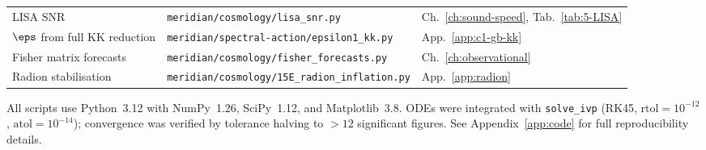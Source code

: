 \begin{table}[h!]
\begin{tabular}{@{}p{3.8cm}p{6.5cm}p{4.2cm}@{}}
LISA SNR &
\texttt{meridian/cosmology/\allowbreak lisa\_snr.py} &
Ch.~\ref{ch:sound-speed}, Tab.~\ref{tab:5-LISA} \\

$\eps$ from full KK reduction &
\texttt{meridian/spectral-action/\allowbreak epsilon1\_kk.py} &
App.~\ref{app:c1-gb-kk} \\

Fisher matrix forecasts &
\texttt{meridian/cosmology/\allowbreak fisher\_forecasts.py} &
Ch.~\ref{ch:observational} \\

Radion stabilisation &
\texttt{meridian/cosmology/\allowbreak 15E\_radion\_inflation.py} &
App.~\ref{app:radion} \\

\bottomrule
\end{tabular}
\end{table}

All scripts use Python~3.12 with NumPy~1.26, SciPy~1.12, and Matplotlib~3.8. ODEs were integrated with \texttt{solve\_ivp} (RK45, $\mathrm{rtol} = 10^{-12}$, $\mathrm{atol} = 10^{-14}$); convergence was verified by tolerance halving to $>12$ significant figures. See Appendix~\ref{app:code} for full reproducibility details.
